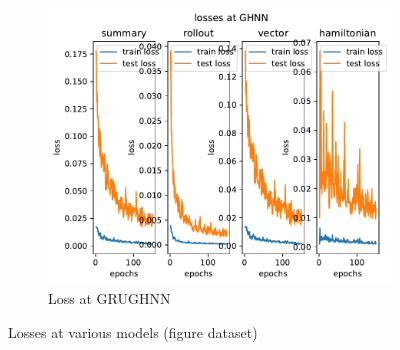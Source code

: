 \begin{figure}[H]
\begin{subfigure}[b]{0.3\textwidth}
	\end{subfigure}
	\hfill
	\begin{subfigure}[b]{0.3\textwidth}
		\centering
		\includegraphics[width=\textwidth]{chapters/chapter5/fignew_grughnn_loss.pdf}
		\caption{Loss at GRUGHNN}
	\end{subfigure}
	
	\caption{Losses at various models (figure dataset)}
	\label{fig_loss}
\end{figure}

